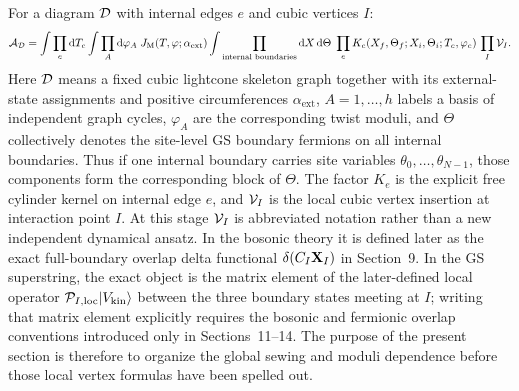 \documentclass[11pt]{article}
\numberwithin{equation}{section}
\newcommand{\dd}{\mathrm{d}}
\begin{document}
For a diagram ${\cal D}$ with internal edges $e$ and cubic vertices $I$:
\begin{equation}
\label{eq:s8-001}
{\cal A}_{\cal D}=
\int\prod_e \dd T_e
\int\prod_A \dd\varphi_A\;
J_{\mathrm{M}}(T,\varphi;\alpha_{\mathrm{ext}})
\int\prod_{\text{internal boundaries}}\dd X\,\dd\Theta\;
\prod_e K_e(X_f,\Theta_f;X_i,\Theta_i;T_e,\varphi_e)\,
\prod_I {\cal V}_I.
\end{equation}
Here ${\cal D}$ means a fixed cubic lightcone skeleton graph together with its external-state assignments and positive circumferences $\alpha_{\mathrm{ext}}$, $A=1,\dots,h$ labels a basis of independent graph cycles, $\varphi_A$ are the corresponding twist moduli, and $\Theta$ collectively denotes the site-level GS boundary fermions on all internal boundaries. Thus if one internal boundary carries site variables $\theta_0,\dots,\theta_{N-1}$, those components form the corresponding block of $\Theta$. The factor $K_e$ is the explicit free cylinder kernel on internal edge $e$, and ${\cal V}_I$ is the local cubic vertex insertion at interaction point $I$.
At this stage ${\cal V}_I$ is abbreviated notation rather than a new independent dynamical ansatz. In the bosonic theory it is defined later as the exact full-boundary overlap delta functional $\delta(C_I{\bf X}_I)$ in Section~9. In the GS superstring, the exact object is the matrix element of the later-defined local operator ${\cal P}_{I,\mathrm{loc}}|V_{\mathrm{kin}}\rangle$ between the three boundary states meeting at $I$; writing that matrix element explicitly requires the bosonic and fermionic overlap conventions introduced only in Sections~11--14. The purpose of the present section is therefore to organize the global sewing and moduli dependence before those local vertex formulas have been spelled out.
\end{document}
